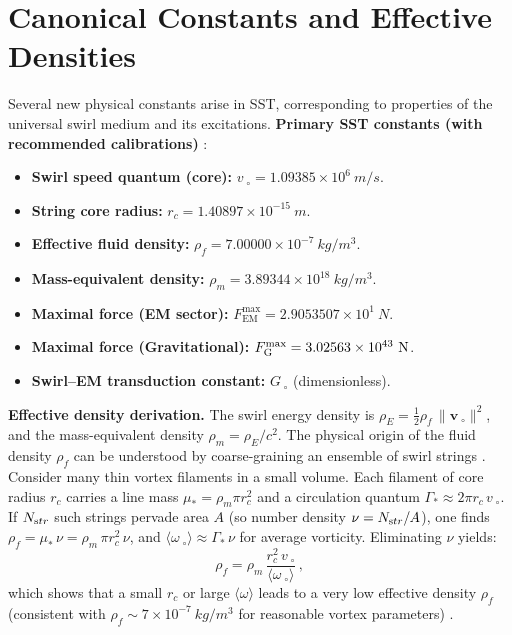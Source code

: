 \documentclass[11pt]{article}
\begin{document}
	\section{Canonical Constants and Effective Densities}
	Several new physical constants arise in SST, corresponding to properties of the universal swirl medium and its excitations. \textbf{Primary SST constants (with recommended calibrations)} \cite{Iskandarani2025Canon034,Iskandarani2025Hydrogen}:
	\begin{itemize}
		\item \textbf{Swirl speed quantum (core):} $v_{\!\!\;\circ} = 1.09385\times10^6~\si{m/s}$.
		\item \textbf{String core radius:} $r_c = 1.40897\times10^{-15}~\si{m}$.
		\item \textbf{Effective fluid density:} $\rho_f = 7.00000\times10^{-7}~\si{kg/m^3}$.
		\item \textbf{Mass-equivalent density:} $\rho_m = 3.89344\times10^{18}~\si{kg/m^3}$.
		\item \textbf{Maximal force (EM sector):} $F_\textrm{EM}^{\max} = 2.9053507\times 10^{1}~\si{N}$. 
		\item \textbf{Maximal force (Gravitational):} $F_{\textrm G}^{\max} = 3.02563\times10^{43}~\si{N}$.
		\item \textbf{Swirl--EM transduction constant:} $G_{\!\!\;\circ}$ (dimensionless).
	\end{itemize}

	\textbf{Effective density derivation.} The swirl energy density is $\rho_E = \tfrac{1}{2}\rho_f\,\|\mathbf{v}_{\!\!\;\circ}\|^2$, and the mass-equivalent density $\rho_m = \rho_E/c^2$. The physical origin of the fluid density $\rho_f$ can be understood by coarse-graining an ensemble of swirl strings \cite{Iskandarani2025Canon034}. Consider many thin vortex filaments in a small volume. Each filament of core radius $r_c$ carries a line mass $\mu_* = \rho_m \pi r_c^2$ and a circulation quantum $\Gamma_* \approx 2\pi r_c\,v_{\!\!\;\circ}$. If $N_{\textrm str}$ such strings pervade area $A$ (so number density $\nu=N_{\textrm str}/A$), one finds $\rho_f = \mu_*\,\nu = \rho_m\,\pi r_c^2\,\nu$, and $\langle\omega_{\!\!\;\circ}\rangle \approx \Gamma_*\,\nu$ for average vorticity. Eliminating $\nu$ yields:
	\[
		\rho_f = \rho_m\,\frac{r_c^2\,v_{\!\!\;\circ}}{\langle \omega_{\!\!\;\circ}\rangle}\,,
	\]
	which shows that a small $r_c$ or large $\langle\omega\rangle$ leads to a very low effective density $\rho_f$ (consistent with $\rho_f \sim 7\times10^{-7}~\si{kg/m^3}$ for reasonable vortex parameters) \cite{Iskandarani2025Canon034}.
\end{document}
